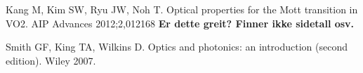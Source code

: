 \begin{thebibliography}{9}

   Kang M, Kim SW, Ryu JW, Noh T.
   Optical properties for the Mott transition in VO2.
   AIP Advances 2012;2,012168 \textbf{Er dette greit? Finner ikke sidetall osv.}

   Smith GF, King TA, Wilkins D.
   Optics and photonics: an introduction (second edition).
   Wiley 2007.
\end{thebibliography}


